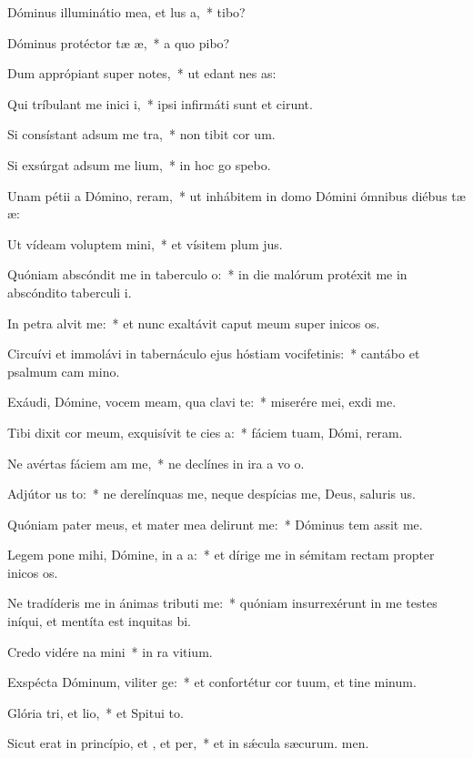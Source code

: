 \item Dóminus illuminátio mea, et lus a,~*  tibo?
\item Dóminus protéctor tæ æ,~* a quo pibo?
\item Dum apprópiant super  notes,~* ut edant nes as:
\item Qui tríbulant me inici i,~* ipsi infirmáti sunt et cirunt.
\item Si consístant adsum me tra,~* non tibit cor um.
\item Si exsúrgat adsum me lium,~* in hoc go spebo.
\item Unam pétii a Dómino,  reram,~* ut inhábitem in domo Dómini ómnibus diébus tæ æ:
\item Ut vídeam voluptem mini,~* et vísitem plum jus.
\item Quóniam abscóndit me in taberculo o:~* in die malórum protéxit me in abscóndito taberculi i.
\item In petra alvit me:~* et nunc exaltávit caput meum super inicos os.
\item Circuívi et immolávi in tabernáculo ejus hóstiam vocifetinis:~* cantábo et psalmum cam mino.
\item Exáudi, Dómine, vocem meam, qua clavi  te:~* miserére mei,  exdi me.
\item Tibi dixit cor meum, exquisívit te cies a:~* fáciem tuam, Dómi, reram.
\item Ne avértas fáciem am  me,~* ne declínes in ira a vo o.
\item Adjútor us to:~* ne derelínquas me, neque despícias me, Deus, saluris us.
\item Quóniam pater meus, et mater mea delirunt me:~* Dóminus tem assit me.
\item Legem pone mihi, Dómine, in a a:~* et dírige me in sémitam rectam propter inicos os.
\item Ne tradíderis me in ánimas tributi me:~* quóniam insurrexérunt in me testes iníqui, et mentíta est inquitas bi.
\item Credo vidére na mini~* in ra vitium.
\item Exspécta Dóminum, viliter ge:~* et confortétur cor tuum, et tine minum.
\item Glória tri, et lio,~* et Spitui to.
\item Sicut erat in princípio, et , et per,~* et in sǽcula sæcurum. men.
